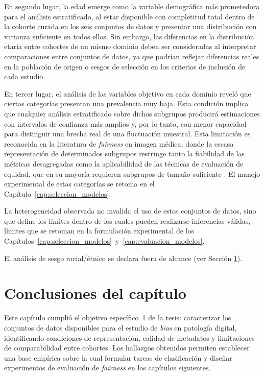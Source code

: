 En segundo lugar, la edad emerge como la variable demográfica más prometedora para el análisis estratificado, al estar disponible con completitud total dentro de la cohorte curada en los seis conjuntos de datos y presentar una distribución con varianza suficiente en todos ellos. Sin embargo, las diferencias en la distribución etaria entre cohortes de un mismo dominio deben ser consideradas al interpretar comparaciones entre conjuntos de datos, ya que podrían reflejar diferencias reales en la población de origen o sesgos de selección en los criterios de inclusión de cada estudio.

En tercer lugar, el análisis de las variables objetivo en cada dominio reveló que ciertas categorías presentan una prevalencia muy baja. Esta condición implica que cualquier análisis estratificado sobre dichos subgrupos producirá estimaciones con intervalos de confianza más amplios y, por lo tanto, con menor capacidad para distinguir una brecha real de una fluctuación muestral. Esta limitación es reconocida en la literatura de \textit{fairness} en imagen médica, donde la escasa representación de determinados subgrupos restringe tanto la fiabilidad de las métricas desagregadas como la aplicabilidad de las técnicas de evaluación de equidad, que en su mayoría requieren subgrupos de tamaño suficiente \parencite{riccilara2022fairness,wastvedt2024small}. El manejo experimental de estas categorías se retoma en el Capítulo~\ref{cap:seleccion_modelos}.

La heterogeneidad observada no invalida el uso de estos conjuntos de datos, sino que define los límites dentro de los cuales pueden realizarse inferencias válidas, límites que se retoman en la formulación experimental de los Capítulos~\ref{cap:seleccion_modelos}~y~\ref{cap:evaluacion_modelos}.

El análisis de sesgo racial/étnico se declara fuera de alcance (ver Sección \ref{sec:conclusiones_capitulo4}).

\section{Conclusiones del capítulo}
\label{sec:conclusiones_capitulo4}

Este capítulo cumplió el objetivo específico~1 de la tesis: caracterizar los conjuntos de datos disponibles para el estudio de \textit{bias} en patología digital, identificando condiciones de representación, calidad de metadatos y limitaciones de comparabilidad entre cohortes. Los hallazgos obtenidos permiten establecer una base empírica sobre la cual formular tareas de clasificación y diseñar experimentos de evaluación de \textit{fairness} en los capítulos siguientes.

